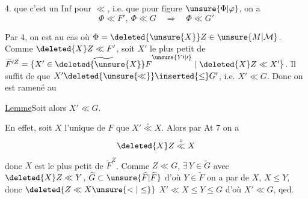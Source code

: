  4.  que c'est un $\mathrm{Inf}$ pour
$\ll$, i.e. que pour  figure $\unsure{\Phi|\varphi}$, on a
\[
\Phi\ll F',\ \Phi\ll G\quad\Longrightarrow\quad\Phi\ll G'
\]

Par  4, on est  au cas
où $\Phi=\deleted{\unsure{X}}Z\in\unsure{M|\mathcal{M}}$. Comme
$\deleted{X}Z\ll F'$, soit $X'$ le plus petit 
de $\widetilde F^{\prime Z}=\{X'\in\widetilde{\deleted{\unsure{X}}F}^{\unsure{Y\prime|\prime}}\mid\deleted{X}Z\ll X'\}$. Il
suffit de  que $X'\deleted{\unsure{\ll}}\inserted{\leq}G'$, i.e.
$X'\ll G$. Donc on est ramené au

\uline{Lemme}\qquad Soit
alors  $X'\ll G$.

En effet, soit $X$ l'unique  de $F$ 
que $X'\overset{\circ}{\ll}X$. Alors par At 7 on a
\[
\deleted{X}Z\overset{\circ}{\ll}X
\]
donc $X$ est le plus petit  de
$\widetilde F^{Z}$. Comme $Z\ll G$, $\exists\,Y\in\widetilde G$ avec
$\deleted{X}Z\ll Y$,     $\widetilde G\subset\unsure{\widehat F|\widetilde F}$ d'où $Y\in\widetilde F$
on a par  de $X$, $X\leq Y$, 
donc $\deleted{Z\ll X\unsure{<|\leq}}$  $X'\ll X\leq Y\leq G$
d'où $X'\ll G$, qed.

